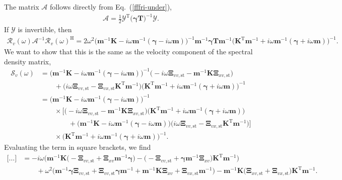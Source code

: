 \documentclass[aps,pre,twocolumn,superscriptaddress,notitlepage]{revtex4-2}
\newcommand{\nn}{\nonumber \\}
\newcommand{\n}{\nonumber}
\newcommand{\bmc}[1]{\bm{\mathcal{#1}}}
\renewcommand{\eqref}[1]{Eq.~(\ref{#1})}
\begin{document}
The matrix $\bmc{A}$ follows directly from \eqref{fffri-under},
\begin{align}
\bmc{A} = \frac{1}{2} \bmc{Y}^\text{T} \big(\bm{\gamma} \bm{T}\big)^{-1} \bmc{Y} .
\end{align}
If $\bmc{Y}$ is invertible, then
\begin{align}
\bmc{R}_v(\omega) \bmc{A}^{-1} \bmc{R}_v(\omega)^\text{H} = 2 \omega^2 \big( \bm{m}^{-1} \bm{K} - i \omega \bm{m}^{-1} (\bm{\gamma} - i \omega \bm{m}) \big)^{-1} \bm{m}^{-1} \bm{\gamma} \bm{T} \bm{m}^{-1} \big(  \bm{K}^\text{T} \bm{m}^{-1} + i \omega \bm{m}^{-1} (\bm{\gamma} + i \omega \bm{m}) \big)^{-1} \label{response-equality-1} .
\end{align}
We want to show that this is the same as the velocity component of the spectral density matrix,
\begin{align}
\bmc{S}_v(\omega) &= \big(\bm{m}^{-1} \bm{K} - i \omega \bm{m}^{-1}(\bm{\gamma} - i \omega \bm{m}) \big)^{-1} \big( - i \omega \bm{\Xi}_{vv,\text{st}} - \bm{m}^{-1} \bm{K} \bm{\Xi}_{xv,\text{st}} \big) \label{response-equality-2} \\
&\qquad + \big(i \omega \bm{\Xi}_{vv,\text{st}} - \bm{\Xi}_{vx,\text{st}} \bm{K}^\text{T} \bm{m}^{-1} \big) \big( \bm{K}^\text{T} \bm{m}^{-1}  + i \omega \bm{m}^{-1}(\bm{\gamma} + i \omega \bm{m}) \big)^{-1} \nn
&= \big(\bm{m}^{-1} \bm{K} - i \omega \bm{m}^{-1}(\bm{\gamma} - i \omega \bm{m}) \big)^{-1} \nn
&\qquad \times \bigg[ \big( - i \omega \bm{\Xi}_{vv,\text{st}} - \bm{m}^{-1} \bm{K} \bm{\Xi}_{xv,\text{st}} \big) \big( \bm{K}^\text{T} \bm{m}^{-1}  + i \omega \bm{m}^{-1}(\bm{\gamma} + i \omega \bm{m}) \big) \nn
&\qquad \qquad + \big(\bm{m}^{-1} \bm{K} - i \omega \bm{m}^{-1}(\bm{\gamma} - i \omega \bm{m}) \big) \big(i \omega \bm{\Xi}_{vv,\text{st}} - \bm{\Xi}_{vx,\text{st}} \bm{K}^\text{T} \bm{m}^{-1} \big) \bigg] \nn
&\qquad \times \big( \bm{K}^\text{T} \bm{m}^{-1}  + i \omega \bm{m}^{-1}(\bm{\gamma} + i \omega \bm{m}) \big)^{-1} . \n
\end{align}
Evaluating the term in square brackets, we find
\begin{align}
\bigg[ \ldots \bigg] &= -i \omega \Big( \bm{m}^{-1} \bm{K} \big( -\bm{\Xi}_{vv,\text{st}} + \bm{\Xi}_{xv} \bm{m}^{-1} \bm{\gamma} \big) - \big( -\bm{\Xi}_{vv,\text{st}} + \bm{\gamma}  \bm{m}^{-1} \bm{\Xi}_{xv} \big) \bm{K}^\text{T} \bm{m}^{-1} \Big) \label{brackets-term} \\
& \qquad + \omega^2 \Big( \bm{m}^{-1} \bm{\gamma} \bm{\Xi}_{vv,\text{st}} + \bm{\Xi}_{vv,\text{st}} \bm{\gamma} \bm{m}^{-1} + \bm{m}^{-1} \bm{K} \bm{\Xi}_{xv} + \bm{\Xi}_{vx,\text{st}} \bm{m}^{-1} \Big) - \bm{m}^{-1} \bm{K} \big( \bm{\Xi}_{xv,\text{st}} + \bm{\Xi}_{vx,\text{st}} \big) \bm{K}^\text{T} \bm{m}^{-1} \n .
\end{align}
\end{document}
